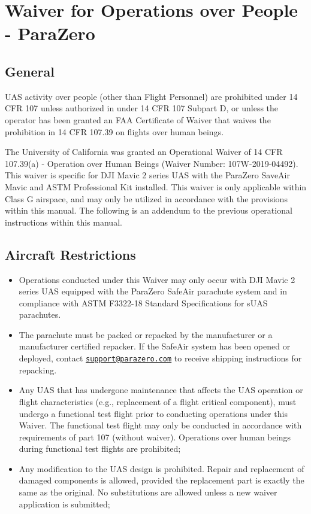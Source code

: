 \documentclass[
]{book}
\providecommand{\tightlist}{%
  \setlength{\itemsep}{0pt}\setlength{\parskip}{0pt}}
\begin{document}
\chapter{Waiver for Operations over People - ParaZero}\label{ch-part39-parazero}

\section{General}\label{s39p-gen}

UAS activity over people (other than Flight Personnel) are prohibited under 14 CFR 107 unless authorized in under 14 CFR 107 Subpart D, or unless the operator has been granted an FAA Certificate of Waiver that waives the prohibition in 14 CFR 107.39 on flights over human beings.

The University of California was granted an Operational Waiver of 14 CFR 107.39(a) - Operation over Human Beings (Waiver Number: 107W-2019-04492). This waiver is specific for DJI Mavic 2 series UAS with the ParaZero SaveAir Mavic and ASTM Professional Kit installed. This waiver is only applicable within Class G airspace, and may only be utilized in accordance with the provisions within this manual. The following is an addendum to the previous operational instructions within this manual.

\section{Aircraft Restrictions}\label{s39p-ar}

\begin{itemize}
\tightlist
\item
  Operations conducted under this Waiver may only occur with DJI Mavic 2 series UAS equipped with the ParaZero SafeAir parachute system and in compliance with ASTM F3322-18 Standard Specifications for sUAS parachutes.
\item
  The parachute must be packed or repacked by the manufacturer or a manufacturer certified repacker. If the SafeAir system has been opened or deployed, contact \href{mailto:support@parazero.com}{\nolinkurl{support@parazero.com}} to receive shipping instructions for repacking.
\item
  Any UAS that has undergone maintenance that affects the UAS operation or flight characteristics (e.g., replacement of a flight critical component), must undergo a functional test flight prior to conducting operations under this Waiver. The functional test flight may only be conducted in accordance with requirements of part 107 (without waiver). Operations over human beings during functional test flights are prohibited;
\item
  Any modification to the UAS design is prohibited. Repair and replacement of damaged components is allowed, provided the replacement part is exactly the same as the original. No substitutions are allowed unless a new waiver application is submitted;
\end{itemize}
\end{document}

